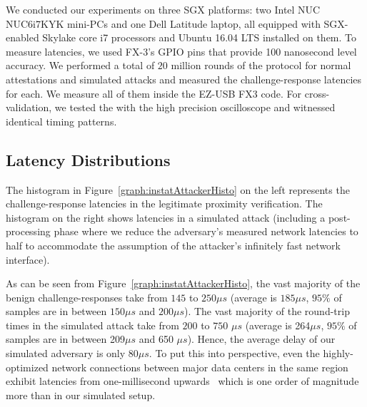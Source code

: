 We conducted our experiments on three SGX platforms: two Intel NUC NUC6i7KYK mini-PCs and one Dell Latitude laptop, all equipped with SGX-enabled Skylake core i7 processors and Ubuntu 16.04 LTS installed on them. To measure latencies, we used FX-3's GPIO pins that provide 100 nanosecond level accuracy. We performed a total of $20$ million rounds of the protocol for normal attestations and simulated attacks and measured the challenge-response latencies for each. We measure all of them inside the EZ-USB FX3 code. For cross-validation, we tested the \device with the high precision oscilloscope and witnessed identical timing patterns.


\subsection{Latency Distributions}
\label{sec:evaluation:results}



The histogram in Figure~\ref{graph:instatAttackerHisto} on the left represents the challenge-response latencies in the legitimate proximity verification. The histogram on the right shows latencies in a simulated attack (including a post-processing phase where we reduce the adversary's measured network latencies to half to accommodate the assumption of the attacker's infinitely fast network interface).

As can be seen from Figure~\ref{graph:instatAttackerHisto}, the vast majority of the benign challenge-responses take from $145$ to $250 \mu s$ (average is $185 \mu s$, $95\%$ of samples are in between $150\mu s$ and  $200\mu s$). The vast majority of the round-trip times in the simulated attack take from $200$ to $750$ $\mu s$ (average is 264$\mu s$, $95\%$ of samples are in between 209$\mu s$ and 650 $\mu s$). Hence, the average delay of our simulated adversary is only $80 \mu s$. To put this into perspective, even the highly-optimized network connections between major data centers in the same region exhibit latencies from one-millisecond upwards~\cite{agarwal_agarwal_2018} which is one order of magnitude more than in our simulated setup.



